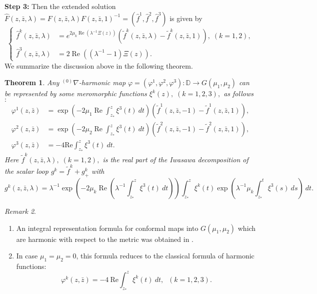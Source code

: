 \documentclass[12pt]{amsart}
\newtheorem{Theorem}{Theorem}[section]
\theoremstyle{definition}
\theoremstyle{remark}
\newtheorem{Remark}[Theorem]{Remark}
\numberwithin{equation}{section}
\begin{document}
 {\bf Step 3:} Then the extended solution $\hat{F}(z,\bar{z},\lambda)=
 F(z,\bar{z},\lambda)F(z,\bar{z},1)^{-1} =
 (\hat f^1, \hat f^2, \hat f^3)$ is given by 
\begin{equation*}
\left\{
\begin{array}{ll}
\hat{f}^k(z,\bar{z},{\lambda})
 &= e^{2 \mu_k {\operatorname {Re}} ({\lambda}^{-1} \Xi(z))}(\tilde f^k(z, \bar z, {\lambda}) - \tilde f^k(z, \bar z, 1)), \;(k =1, 2),  \\
 \hat f^3(z,\bar{z},\lambda) & =2 {\operatorname {Re}} ((\lambda^{-1}-1) \Xi(z)).
\end{array}
\right.
\end{equation*}
 We summarize the discussion above in the following theorem.
\begin{Theorem}\label{thm:repforsol}
  Any ${}^{(0)}\nabla$-harmonic map 
 $\varphi=(\varphi^1,\varphi^2,\varphi^3): \mathbb{D}\to G(\mu_1,\mu_2)$ 
 can be represented by some meromorphic functions $\xi^k(z), \;(k =1, 2, 3),$ 
 as follows$:$
\begin{align*}
 \varphi^{1}(z,\bar{z})&
 = \exp \left(-2 \mu_1 {\operatorname {Re}} \int_{z_*}^z \xi^3(t) \> dt \right)
 \left( \tilde f^{1}(z, \bar z, -1) -\tilde f^{1}(z, \bar z, 1)\right), \\ 
 \varphi^{2}(z,\bar{z})&= 
 \exp \left(-2 \mu_2 {\operatorname {Re}} \int_{z_*}^z \xi^3(t) \> dt \right)
 \left( \tilde f^{2}(z, \bar z, -1) -\tilde f^{2}(z, \bar z, 1)\right), \\
\varphi^{3}(z,\bar{z})&= -4 \mathrm{Re} \int_{z_*}^z \xi^3(t) \>dt.
\end{align*}
 Here $\tilde f^k(z, \bar z, {\lambda}), \;(k =1, 2),$ is the real part of the Iwasawa 
 decomposition of the scalar loop $g^k = \tilde f^k + g^k_+$ with
\begin{equation*}
  g^k(z, \bar z, {\lambda}) = {\lambda}^{-1}\exp \left(-2\mu_k  
 {\operatorname {Re}} ({\lambda}^{-1}\int_{z_*}^z \xi^3(t) \> dt) \right)
 \int_{z_*}^z \xi^{k}(t) \exp\left({\lambda}^{-1} \mu_k \int_{z_*}^t \xi^3(s) \> ds\right)\>dt.
\end{equation*}
\end{Theorem}
\begin{Remark}
\mbox{}
\begin{enumerate}
 \item An integral representation formula for conformal maps into $G(\mu_1,\mu_2)$ which are 
 harmonic with respect to the metric was obtained in \cite{InoguchiLee}.

\item  In case $\mu_1=\mu_2=0$, this formula reduces to
 the classical formula of harmonic functions:
\begin{equation*}
\varphi^{k}(z,\bar{z})= -4\>\mathrm{Re}\int_{z_*}^{z} \xi^k(t)\>dt, \;\;(k =1, 2, 3).
\end{equation*}
\end{enumerate}
\end{Remark}
\end{document}

